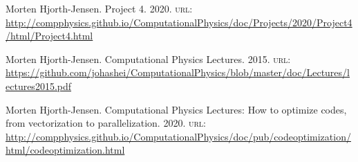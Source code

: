 \documentclass[a4paper,10pt,onecolumn]{article}
\begin{document}
\begin{thebibliography}{9}

Morten Hjorth-Jensen. Project 4. 2020. \textsc{url: }\url{http://compphysics.github.io/ComputationalPhysics/doc/Projects/2020/Project4/html/Project4.html}

Morten Hjorth-Jensen. Computational Physics Lectures. 2015. \textsc{url: }\url{https://github.com/johashei/ComputationalPhysics/blob/master/doc/Lectures/lectures2015.pdf}

Morten Hjorth-Jensen. Computational Physics Lectures: How to optimize codes, from vectorization to parallelization. 2020. \textsc{url: }\url{http://compphysics.github.io/ComputationalPhysics/doc/pub/codeoptimization/html/codeoptimization.html}


\end{thebibliography}



\end{document}
